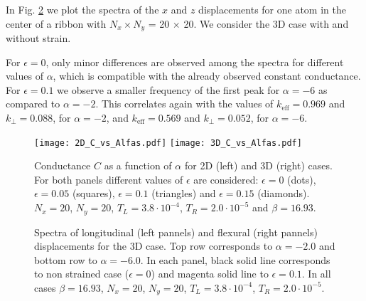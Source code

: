 \documentclass[12pt]{article}
\begin{document}
In Fig. \ref{fig:spectraA} we plot the spectra of the  $x$ and $z$ displacements for one atom in the center of a ribbon with $N_x \times N_y$ = 20 $\times$ 20. We consider the 3D case with and without strain.

For $\epsilon = 0$, only minor differences are observed among the spectra for different values of $\alpha$, which is compatible with the already observed constant conductance. For $\epsilon = 0.1$ we observe a smaller frequency of the first peak for $\alpha = -6$ as compared to $\alpha = -2$. This correlates again with the values of $k_{\text{eff}} = 0.969$ and $k_{\perp} = 0.088$, for $\alpha = -2$, and $k_{\text{eff}} = 0.569$ and $k_{\perp} = 0.052$, for $\alpha = -6$.

\begin{figure}[ht]
 	\begin{center}
 		\texttt{[image: 2D\_C\_vs\_Alfas.pdf]}
 		\texttt{[image: 3D\_C\_vs\_Alfas.pdf]}
 	\end{center}  
\caption{Conductance $C$ as a function of $\alpha$ for 2D (left) and 3D (right) cases. For both panels different values of $\epsilon$ are considered: $\epsilon=0$ (dots), $\epsilon=0.05$ (squares), $\epsilon=0.1$ (triangles) and  $\epsilon=0.15$ (diamonds). $N_x =20$, $N_y =20$, $T_{L}=3.8\cdot 10^{-4}$, $T_{R}=2.0\cdot 10^{-5}$ and $\beta=16.93$.}
\label{fig:alfa}
\end{figure}


\begin{figure}[h]
\begin{minipage}{0.5\textwidth}
\end{minipage}
\hfill
\begin{minipage}{0.5\textwidth}
\end{minipage}%
\vfill
\begin{minipage}{0.5\textwidth}
\end{minipage}%
\hfill
\begin{minipage}{0.5\textwidth}
\end{minipage}%
\vfill
\caption{Spectra of longitudinal (left pannels) and flexural (right pannels) displacements for the 3D case. Top row corresponds to $\alpha =-2.0$ and bottom row to $\alpha = -6.0$. In each panel, black solid line corresponds to non strained case ($\epsilon = 0$) and magenta solid line to $\epsilon = 0.1$. In all cases $\beta = 16.93$,  $N_x =20$, $N_y =20$, $T_{L}=3.8\cdot 10^{-4}$, $T_{R}=2.0\cdot 10^{-5}$.}
\label{fig:spectraA}
\end{figure}
\end{document}
